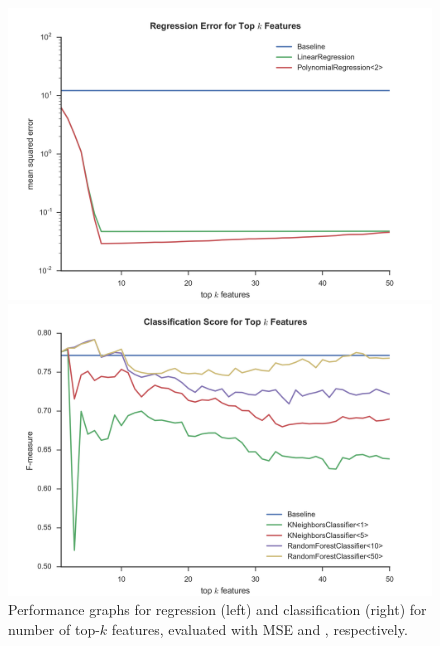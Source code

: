 \begin{figure}[h]
\centering
\begin{minipage}{.49\textwidth}
  \centering
  \includegraphics[width=\linewidth]{figures/reg_mse_train.png}
\end{minipage}
\begin{minipage}{.49\textwidth}
  \centering
  \includegraphics[width=\linewidth]{figures/cls_fscore_train.png}
\end{minipage}
\caption{Performance graphs for regression (left) and classification (right) for
  number of top-$k$ features, evaluated with MSE and \fmeasure, respectively.}
\label{fig:training}
\end{figure}

